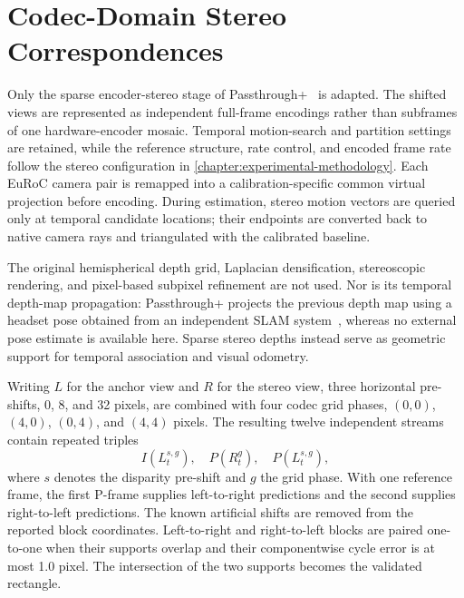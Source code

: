 \section{Codec-Domain Stereo Correspondences}

Only the sparse encoder-stereo stage of Passthrough+~\cite{chaurasia2020passthrough} is adapted. The shifted views are represented as independent full-frame encodings rather than subframes of one hardware-encoder mosaic. Temporal motion-search and partition settings are retained, while the reference structure, rate control, and encoded frame rate follow the stereo configuration in \autoref{chapter:experimental-methodology}. Each EuRoC camera pair is remapped into a calibration-specific common virtual projection before encoding. During estimation, stereo motion vectors are queried only at temporal candidate locations; their endpoints are converted back to native camera rays and triangulated with the calibrated baseline.

The original hemispherical depth grid, Laplacian densification, stereoscopic rendering, and pixel-based subpixel refinement are not used. Nor is its temporal depth-map propagation: Passthrough+ projects the previous depth map using a headset pose obtained from an independent SLAM system~\cite{chaurasia2020passthrough}, whereas no external pose estimate is available here. Sparse stereo depths instead serve as geometric support for temporal association and visual odometry.

Writing $L$ for the anchor view and $R$ for the stereo view, three horizontal
pre-shifts, 0, 8, and 32 pixels, are combined with four codec
grid phases, $(0,0)$, $(4,0)$, $(0,4)$, and $(4,4)$ pixels. The resulting twelve
independent streams contain repeated triples
\begin{equation}
  I(L_t^{s,g}),\quad P(R_t^g),\quad P(L_t^{s,g}),
\end{equation}
where $s$ denotes the disparity pre-shift and $g$ the grid phase. With one
reference frame, the first P-frame supplies left-to-right predictions and the
second supplies right-to-left predictions. The known artificial shifts are
removed from the reported block coordinates. Left-to-right and right-to-left
blocks are paired one-to-one when their supports overlap and their componentwise
cycle error is at most 1.0 pixel. The intersection of the two supports becomes
the validated rectangle.

